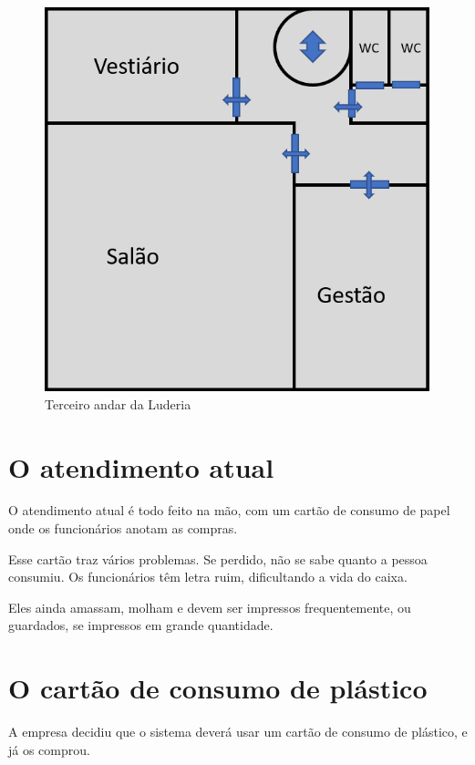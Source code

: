 \begin{figure}[hbt]
    \centering
    \includegraphics[scale=0.8]{imagens/TerceiroAndar.png}
    \caption{Terceiro andar da Luderia}
    \label{fig:andar3}
\end{figure}

\section{O atendimento atual}

O atendimento atual é todo feito na mão, com um cartão de consumo de papel onde os funcionários anotam as compras.

Esse cartão traz vários problemas. Se perdido, não se sabe quanto a pessoa consumiu. Os funcionários têm letra ruim, dificultando a vida do caixa.

Eles ainda amassam, molham e devem ser impressos frequentemente, ou guardados, se impressos em grande quantidade.


\section{O cartão de consumo de plástico}

A empresa decidiu que o sistema deverá usar um cartão de consumo de plástico, e já os comprou.

